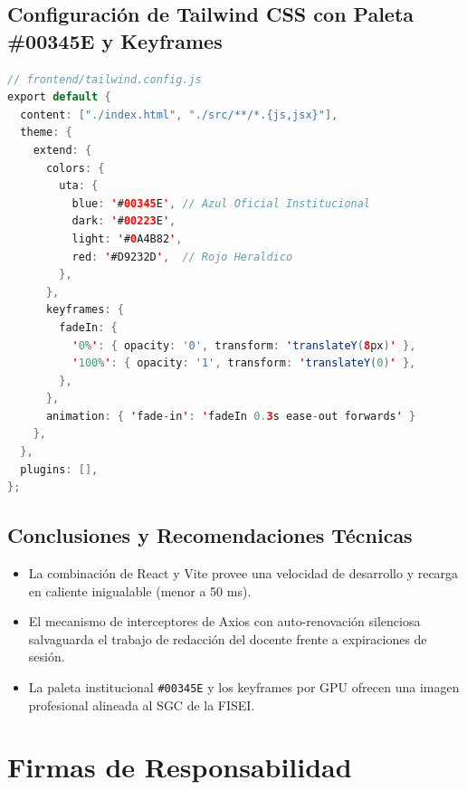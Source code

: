 \documentclass[12pt,a4paper]{article}
\begin{document}
\subsection{Configuración de Tailwind CSS con Paleta \#00345E y Keyframes}
\begin{lstlisting}[language=Java]
// frontend/tailwind.config.js
export default {
  content: ["./index.html", "./src/**/*.{js,jsx}"],
  theme: {
    extend: {
      colors: {
        uta: {
          blue: '#00345E', // Azul Oficial Institucional
          dark: '#00223E',
          light: '#0A4B82',
          red: '#D9232D',  // Rojo Heraldico
        },
      },
      keyframes: {
        fadeIn: {
          '0%': { opacity: '0', transform: 'translateY(8px)' },
          '100%': { opacity: '1', transform: 'translateY(0)' },
        },
      },
      animation: { 'fade-in': 'fadeIn 0.3s ease-out forwards' }
    },
  },
  plugins: [],
};
\end{lstlisting}

\subsection{Conclusiones y Recomendaciones Técnicas}
\begin{itemize}[leftmargin=1.5em, itemsep=2pt]
    \item La combinación de React y Vite provee una velocidad de desarrollo y recarga en caliente inigualable (menor a 50 ms).
    \item El mecanismo de interceptores de Axios con auto-renovación silenciosa salvaguarda el trabajo de redacción del docente frente a expiraciones de sesión.
    \item La paleta institucional \texttt{\#00345E} y los keyframes por GPU ofrecen una imagen profesional alineada al SGC de la FISEI.
\end{itemize}

\vspace{0.3cm}

\section{Firmas de Responsabilidad}
\end{document}
